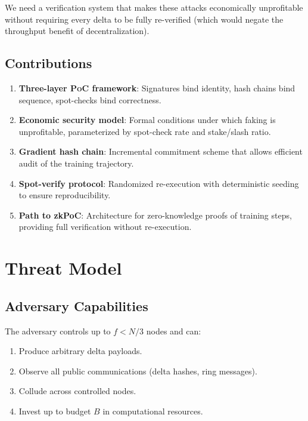 \documentclass[11pt,letterpaper]{article}
\newcommand{\PoC}{\textsc{PoC}}
\begin{document}
We need a verification system that makes these attacks economically unprofitable without requiring every delta to be fully re-verified (which would negate the throughput benefit of decentralization).

\subsection{Contributions}

\begin{enumerate}
    \item \textbf{Three-layer \PoC{} framework}: Signatures bind identity, hash chains bind sequence, spot-checks bind correctness.
    \item \textbf{Economic security model}: Formal conditions under which faking is unprofitable, parameterized by spot-check rate and stake/slash ratio.
    \item \textbf{Gradient hash chain}: Incremental commitment scheme that allows efficient audit of the training trajectory.
    \item \textbf{Spot-verify protocol}: Randomized re-execution with deterministic seeding to ensure reproducibility.
    \item \textbf{Path to zkPoC}: Architecture for zero-knowledge proofs of training steps, providing full verification without re-execution.
\end{enumerate}

\section{Threat Model}
\label{sec:threat}

\subsection{Adversary Capabilities}

The adversary controls up to $f < N/3$ nodes and can:

\begin{enumerate}
    \item Produce arbitrary delta payloads.
    \item Observe all public communications (delta hashes, ring messages).
    \item Collude across controlled nodes.
    \item Invest up to budget $B$ in computational resources.
\end{enumerate}
\end{document}
